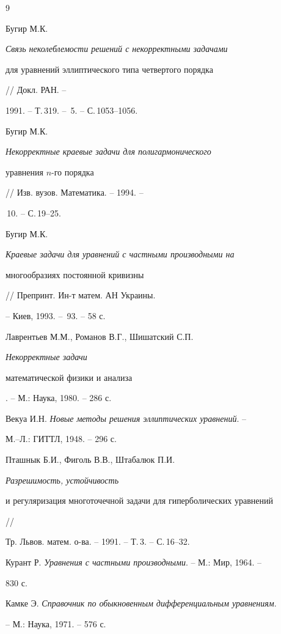 \begin{thebibliography}{9} 


 




Бугир М.К. {\em Связь неколеблемости решений с некорректными задачами 


для уравнений эллиптического типа четвертого порядка} // Докл. РАН. -- 


1991. -- Т.\,319. -- \No\,5. -- С.\,1053--1056. 




Бугир М.К. {\em Некорректные краевые задачи для полигармонического 


уравнения $n$-го порядка} // Изв. вузов. Математика. -- 1994. -- 


\No\,10. -- С.\,19--25. 




Бугир М.К. {\em Краевые задачи для уравнений с частными производными на 


многообразиях постоянной кривизны} // Препринт. Ин-т матем. АН Украины. 


-- Киев, 1993. -- \No\,93. -- 58 с. 




Лаврентьев М.М., Романов В.Г., Шишатский С.П. {\em Некорректные задачи 


математической физики и анализа}. -- М.: Наука, 1980. -- 286 с. 




Векуа И.Н. {\em Новые методы решения эллиптических уравнений}. -- 


М.--Л.: ГИТТЛ, 1948. -- 296 с. 




Пташнык Б.И., Фиголь В.В., Штабалюк П.И. {\em Разрешимость, устойчивость 


и регуляризация многоточечной задачи для гиперболических уравнений} // 


Тр. Львов. матем. о-ва. -- 1991. -- Т.\,3. -- С.\,16--32. 




Курант Р. {\em Уравнения с частными производными}. -- М.: Мир, 1964. -- 


830 с. 




Камке Э. {\em Справочник по обыкновенным дифференциальным уравнениям}. 


-- М.: Наука, 1971. -- 576 с. 


 


\end{thebibliography} 


 


\vskip 2cm 


 








\label{end} 


 


